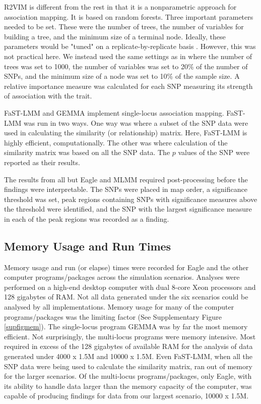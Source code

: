 \documentclass{nature}
\begin{document}
R2VIM is different from the rest in that it is a nonparametric approach for association mapping. It is based on random forests. Three important parameters needed to be  set. 
These were the number of trees, the number of variables for building a tree, and the minimum size of a terminal node. Ideally, these parameters would be "tuned" on a replicate-by-replicate 
basis \cite{boulesteix2012overview}. However, this was not practical here. We instead used the same settings as in \cite{szymczak2016r2vim} where 
the number of trees was set to 1000, the number of variables was set to 20\% of the number of SNPs, and 
  the minimum size of a node was set to 10\% of the sample size.
A relative importance measure was calculated 
for each SNP measuring its strength of association with the trait.

FaST-LMM and GEMMA implement single-locus association mapping. FaST-LMM was run in two ways. One way was where a subset of the SNP data were used in calculating the similarity (or relationship) matrix. Here, FaST-LMM is highly efficient, computationally. The other was where calculation of the similarity matrix was based on all the SNP data. The $p$ values of the SNP were reported as their results. 


The results from all but Eagle and MLMM required post-processing before the findings were interpretable.  The SNPs were placed in map order, 
a significance threshold was set, peak regions containing SNPs with significance measures above the threshold were identified, and the SNP with the largest 
significance measure in each of the peak regions was recorded as a finding. 


 



\subsection{Memory Usage and Run Times}

Memory usage and run (or elapse) times were recorded for Eagle and the other computer programs/packages across the simulation scenarios. 
Analyses were performed on a high-end desktop computer with dual 8-core Xeon processors and 128 gigabytes of RAM. Not all data generated under the six scenarios could be analysed by all implementations. Memory usage 
for many of the computer programs/packages was the limiting factor (See Supplementary Figure \ref{supfigmem}).  The single-locus program GEMMA was by 
far the most memory efficient. Not surprisingly, the multi-locus programs were memory intensive. Most required in 
excess of the 128 gigabytes of available RAM for the analysis of data generated under 4000 x 1.5M and 10000 x 1.5M.  
Even FaST-LMM, when all the SNP data were being used to calculate the similarity matrix, ran out of memory for the larger scenarios.
Of the multi-locus programs/packages, only Eagle,  
with its ability to handle data larger than the memory capacity of the computer, was capable of producing findings 
for data from our largest scenario, 10000 x 1.5M. 
\end{document}
